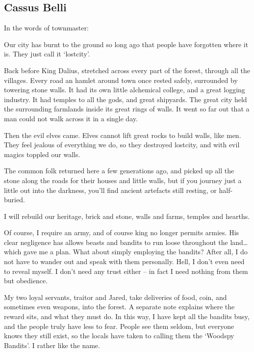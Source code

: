 \begin{multicols}{2}

\subsection{Cassus Belli}
\label{expanding_wilderness}

\noindent
In the words of \gls{townmaster}:

\begin{exampletext}

  Our city has burnt to the ground so long ago that people have forgotten where it is.
  They just call it `\gls{lostcity}'.

  Back before King Dalius,  stretched across every part of the forest, through all the villages.
  Every road an hamlet around \gls{town} once rested safely, surrounded by towering stone walls.
  It had its own little alchemical college, and a great logging industry.
  It had temples to all the gods, and great shipyards.
  The great city held the surrounding farmlands inside its great rings of walls.
  It went so far out that a man could not walk across it in a single day.

  Then the evil elves came.
  Elves cannot lift great rocks to build walls, like men.
  They feel jealous of everything we do, so they destroyed \gls{lostcity}, and with evil magics toppled our walls.

  The common folk returned here a few generations ago, and picked up all the stone along the roads for their houses and little walls, but if you journey just a little out into the darkness, you'll find ancient artefacts still resting, or half-buried.

  I will rebuild our heritage, brick and stone, walls and farms, temples and hearths.

  Of course, I require an army, and of course \gls{king} no longer permits armies.
  His clear negligence has allows beasts and bandits to run loose throughout the land\ldots which gave me a plan.
  What about simply employing the bandits?
  After all, I do not have to wander out and speak with them personally.
  Hell, I don't even need to reveal myself.
  I don't need any trust either -- in fact I need nothing from them but obedience.

  My two loyal servants, \gls{traitor} and Jared, take deliveries of food, coin, and sometimes even weapons, into the forest.
  A separate note explains where the reward sits, and what they must do.
  In this way, I have kept all the bandits busy, and the people truly have less to fear.
  People see them seldom, but everyone knows they still exist, so the locals have taken to calling them the `Woodspy Bandits'.
  I rather like the name.


\end{exampletext}
\end{multicols}
